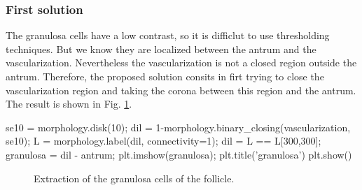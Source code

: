 \subsubsection{First solution}
The granulosa cells have a low contrast, so it is difficlut to use thresholding techniques. But we know they are localized between the antrum and the vascularization. Nevertheless the vascularization is not a closed region outside the antrum. Therefore, the proposed solution consits in firt trying to close the vascularization region and taking the corona between this region and the antrum. The result is shown in Fig. \ref{fig:segfollicle:python:granulosa}.

\begin{python}
se10 = morphology.disk(10);
dil = 1-morphology.binary_closing(vascularization, se10);
L = morphology.label(dil, connectivity=1);
dil = L == L[300,300];
granulosa = dil - antrum;
plt.imshow(granulosa);
plt.title('granulosa')
plt.show()
\end{python}

\begin{figure}[htbp]
\centering\caption{Extraction of the granulosa cells of the follicle.}%
 \hfill
 \hfill
 \label{fig:segfollicle:python:granulosa}%
\end{figure}

